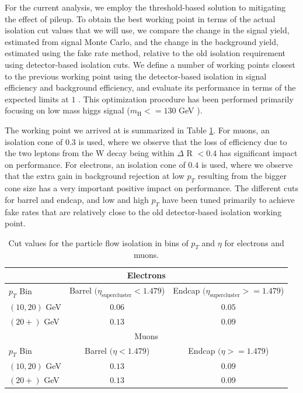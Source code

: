 For the current analysis, we employ the threshold-based solution to mitigating the effect of pileup. 
To obtain the best working point in terms of the actual isolation
cut values that we will use, we compare the change in the signal yield, estimated from signal
Monte Carlo, and the change in the background yield, estimated using the fake rate method,
relative to the old isolation requirement using detector-based isolation cuts. We define a number
of working points closest to the previous working point using the detector-based isolation in
signal efficiency and background efficiency, and evaluate its performance in terms of the
expected limits at $1$ \ifb. This optimization procedure has been performed primarily focusing on
low mass higgs signal ($m_{\mathrm{H}} <= 130$ GeV ). 

The working point we arrived at is summarized in Table \ref{tab:PFIsoWorkingPoint}. For muons, an isolation cone of
$0.3$ is used, where we observe that the loss of efficiency due to the two leptons from the
W decay being within $\Delta$ R $ < 0.4$ has significant impact on performance. For electrons, an
isolation cone of $0.4$ is used, where we observe that the extra gain in background rejection
at low $p_{T}$ resulting from the bigger cone size has a very important positive impact on 
performance. The different cuts for barrel and endcap, and low and high $p_{T}$ have been tuned
primarily to achieve fake rates that are relatively close to the old detector-based
isolation working point.

\begin{table}[!htbp]
\begin{center}
\begin{tabular}{|l|c|c|}
\hline
\multicolumn{3}{|c|}{Electrons} \\
\hline
$p_{T}$ Bin      & Barrel $(\eta_{\mathrm{supercluster}} < 1.479$) & Endcap $(\eta_{\mathrm{supercluster}} >= 1.479$) \\
\hline
$(10,20)$ GeV  &  $0.06$    & $0.05$     \\
$(20+)$ GeV    &  $0.13$    & $0.09$     \\
\hline
\multicolumn{3}{|c|}{Muons} \\
\hline
$p_{T}$ Bin      & Barrel $(\eta < 1.479$) & Endcap $(\eta >= 1.479$) \\

\hline
$(10,20)$ GeV  &  $0.13$    & $0.09$     \\
$(20+)$ GeV    &  $0.13$    & $0.09$     \\

\hline
\end{tabular}
\caption{Cut values for the particle flow isolation in bins of $p_{T}$ and $\eta$ for electrons
and muons.  }
\label{tab:PFIsoWorkingPoint}
\end{center}
\end{table}

